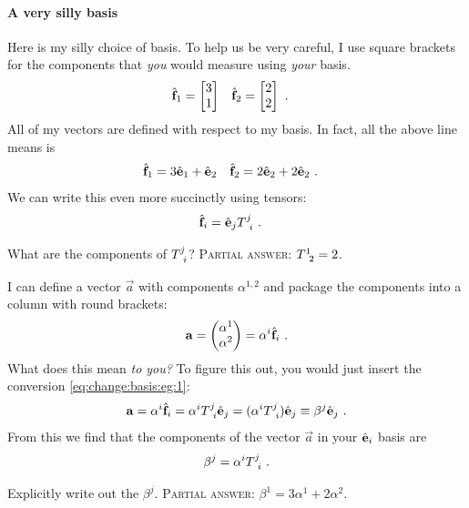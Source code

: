 \documentclass[12pt, oneside]{report}    %
\begin{document}
\paragraph{A very silly basis}
Here is my silly choice of basis. To help us be very careful, I use square brackets for the components that \emph{you} would measure using \emph{your} basis. 
\begin{align}
    \hat{\mathbf{f}}_1 &=
    \begin{bmatrix}
        3 \\ 1
    \end{bmatrix}
    &
    \hat{\mathbf{f}}_2 &=
    \begin{bmatrix}
        2 \\ 2
    \end{bmatrix} \ .
\end{align}
All of my vectors are defined with respect to my basis. In fact, all the above line means is
\begin{align}
    \hat{\mathbf{f}}_1 &= 3\hat{\mathbf{e}}_1 + \hat{\mathbf{e}}_2
    &
    \hat{\mathbf{f}}_2 &= 2\hat{\mathbf{e}}_2 + 2\hat{\mathbf{e}}_2
    \ .
    \label{eq:change:basis:eg:1}
\end{align}
We can write this even more succinctly using tensors:
\begin{align}
    \bas{f}_i &= \bas{e}_j T\aij{j}{i} \ .
    \label{eq:change:basis:eg:2}
\end{align}
\begin{exercise}
What are the components of $T\aij{j}{i}$? \textsc{Partial answer:} $T\aij{1}{2} = 2$.
\end{exercise}


I can define a vector $\vec{a}$ with components $\alpha^{1,2}$ and package the components into a column with round brackets:
\begin{align}
    \mathbf{a} 
    = \begin{pmatrix}
        \alpha^1 \\ \alpha^2
    \end{pmatrix}
    =
    \alpha^i \hat{\mathbf{f}}_i  \ .
\end{align}
What does this mean \emph{to you?} To figure this out, you would just insert the conversion \eqref{eq:change:basis:eg:1}:
\begin{align}
    \vec{a} = \alpha^i \bas{f}_i = \alpha^i T\aij{j}{i} \bas{e}_j = (\alpha^i T\aij{j}{i})\bas{e}_j \equiv \beta^j \bas{e}_j \ .
\end{align}
From this we find that the components of the vector $\vec{a}$ in your $\hat{\mathbf{e}}_i$ basis are
\begin{align}
    \beta^j = \alpha^i T\aij{j}{i} \ . 
    \label{eq:beta:alpha:T:convert}
\end{align}
\begin{exercise}
Explicitly write out the $\beta^j$. \textsc{Partial answer:} $\beta^1 = 3\alpha^1 + 2\alpha^2$.
\end{exercise}
\end{document}
